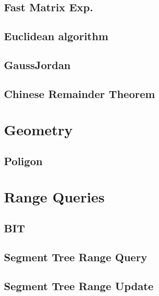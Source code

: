 \subsection{ Fast Matrix Exp.}
\raggedbottom
\hrulefill
\subsection{  Euclidean algorithm}
\raggedbottom
\hrulefill
\subsection{  GaussJordan}
\raggedbottom
\hrulefill
\subsection{   Chinese Remainder Theorem}
\raggedbottom
\hrulefill

\section{Geometry}
\subsection{   Poligon}
\raggedbottom
\hrulefill

\section{Range Queries}
\subsection{BIT}
\raggedbottom
\hrulefill
\subsection{   Segment Tree Range Query}
\raggedbottom
\hrulefill
\subsection{  Segment Tree Range Update}
\raggedbottom
\hrulefill
